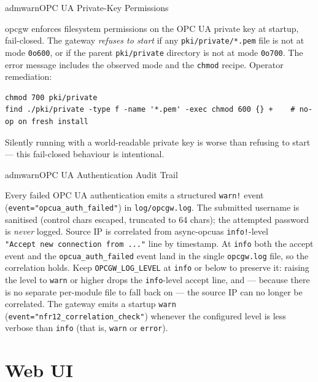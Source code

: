 \begin{admonition}{admwarn}{OPC UA Private-Key Permissions}

opcgw enforces filesystem permissions on the OPC UA private key at startup, fail-closed. The gateway \emph{refuses to start} if any \texttt{pki/private/*.pem} file is not at mode \texttt{0o600}, or if the parent \texttt{pki/private} directory is not at mode \texttt{0o700}. The error message includes the observed mode and the \texttt{chmod} recipe. Operator remediation:

\begin{lstlisting}
chmod 700 pki/private
find ./pki/private -type f -name '*.pem' -exec chmod 600 {} +    # no-op on fresh install
\end{lstlisting}

Silently running with a world-readable private key is worse than refusing to start --- this fail-closed behaviour is intentional.

\end{admonition}

\begin{admonition}{admwarn}{OPC UA Authentication Audit Trail}

Every failed OPC UA authentication emits a structured \texttt{warn!} event (\texttt{event="opcua\_auth\_failed"}) in \texttt{log/opcgw.log}. The submitted username is sanitised (control chars escaped, truncated to 64 chars); the attempted password is \emph{never} logged. Source IP is correlated from async-opcua\textquotesingle s \texttt{info!}-level \texttt{"Accept\ new\ connection\ from\ ..."} line by timestamp. At \texttt{info} both the accept event and the \texttt{opcua\_auth\_failed} event land in the single \texttt{opcgw.log} file, so the correlation holds. Keep \texttt{OPCGW\_LOG\_LEVEL} at \texttt{info} or below to preserve it: raising the level to \texttt{warn} or higher drops the \texttt{info}-level accept line, and --- because there is no separate per-module file to fall back on --- the source IP can no longer be correlated. The gateway emits a startup \texttt{warn} (\texttt{event="nfr12\_correlation\_check"}) whenever the configured level is less verbose than \texttt{info} (that is, \texttt{warn} or \texttt{error}).

\end{admonition}

\section{Web UI}\label{sec-web-config}

